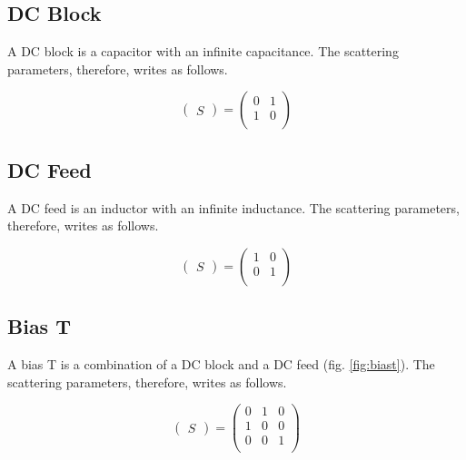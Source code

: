 \subsection{DC Block}

A DC block is a capacitor with an infinite capacitance.  The
scattering parameters, therefore, writes as follows.

\begin{equation}
\begin{pmatrix}
S
\end{pmatrix}
=
\begin{pmatrix}
0 & 1\\
1 & 0\\
\end{pmatrix}
\end{equation}

\subsection{DC Feed}

A DC feed is an inductor with an infinite inductance.  The scattering
parameters, therefore, writes as follows.

\begin{equation}
\begin{pmatrix}
S
\end{pmatrix}
=
\begin{pmatrix}
1 & 0\\
0 & 1\\
\end{pmatrix}
\end{equation}

\subsection{Bias T}

A bias T is a combination of a DC block and a DC feed
(fig. \ref{fig:biast}).  The scattering parameters, therefore, writes
as follows.

\begin{equation}
\begin{pmatrix}
S
\end{pmatrix}
=
\begin{pmatrix}
0 & 1 & 0\\
1 & 0 & 0\\
0 & 0 & 1\\
\end{pmatrix}
\end{equation}

